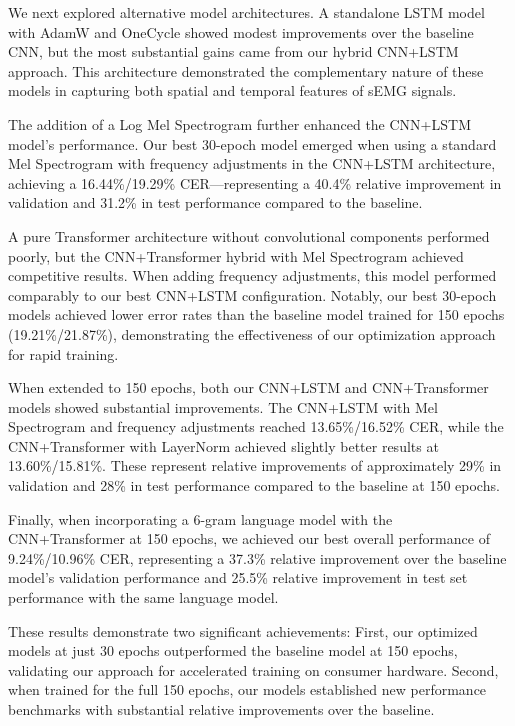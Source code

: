 \documentclass{article}
\begin{document}
  We next explored alternative model architectures. A standalone LSTM model with AdamW and OneCycle showed modest improvements over the baseline CNN, but the most substantial gains came from our hybrid CNN+LSTM approach. This architecture demonstrated the complementary nature of these models in capturing both spatial and temporal features of sEMG signals.
  
  The addition of a Log Mel Spectrogram further enhanced the CNN+LSTM model's performance. Our best 30-epoch model emerged when using a standard Mel Spectrogram with frequency adjustments in the CNN+LSTM architecture, achieving a 16.44\%/19.29\% CER—representing a 40.4\% relative improvement in validation and 31.2\% in test performance compared to the baseline.
  
  A pure Transformer architecture without convolutional components performed poorly, but the CNN+Transformer hybrid with Mel Spectrogram achieved competitive results. When adding frequency adjustments, this model performed comparably to our best CNN+LSTM configuration. Notably, our best 30-epoch models achieved lower error rates than the baseline model trained for 150 epochs (19.21\%/21.87\%), demonstrating the effectiveness of our optimization approach for rapid training.
  
  When extended to 150 epochs, both our CNN+LSTM and CNN+Transformer models showed substantial improvements. The CNN+LSTM with Mel Spectrogram and frequency adjustments reached 13.65\%/16.52\% CER, while the CNN+Transformer with LayerNorm achieved slightly better results at 13.60\%/15.81\%. These represent relative improvements of approximately 29\% in validation and 28\% in test performance compared to the baseline at 150 epochs.
  
  Finally, when incorporating a 6-gram language model with the CNN+Transformer at 150 epochs, we achieved our best overall performance of 9.24\%/10.96\% CER, representing a 37.3\% relative improvement over the baseline model's validation performance and 25.5\% relative improvement in test set performance with the same language model.
  
  These results demonstrate two significant achievements: First, our optimized models at just 30 epochs outperformed the baseline model at 150 epochs, validating our approach for accelerated training on consumer hardware. Second, when trained for the full 150 epochs, our models established new performance benchmarks with substantial relative improvements over the baseline.
\end{document}
